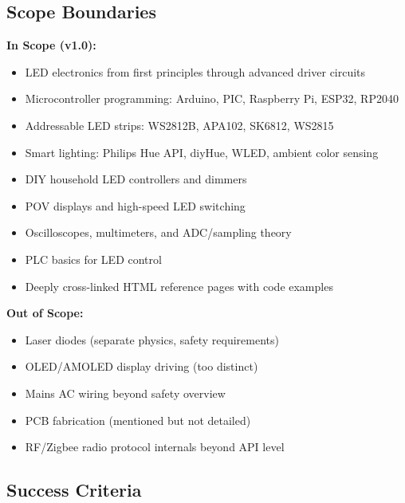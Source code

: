 \documentclass[11pt,letterpaper]{article}
\begin{document}
\subsection{Scope Boundaries}

\textbf{In Scope (v1.0):}
\begin{itemize}[noitemsep]
  \item LED electronics from first principles through advanced driver circuits
  \item Microcontroller programming: Arduino, PIC, Raspberry Pi, ESP32, RP2040
  \item Addressable LED strips: WS2812B, APA102, SK6812, WS2815
  \item Smart lighting: Philips Hue API, diyHue, WLED, ambient color sensing
  \item DIY household LED controllers and dimmers
  \item POV displays and high-speed LED switching
  \item Oscilloscopes, multimeters, and ADC/sampling theory
  \item PLC basics for LED control
  \item Deeply cross-linked HTML reference pages with code examples
\end{itemize}

\textbf{Out of Scope:}
\begin{itemize}[noitemsep]
  \item Laser diodes (separate physics, safety requirements)
  \item OLED/AMOLED display driving (too distinct)
  \item Mains AC wiring beyond safety overview
  \item PCB fabrication (mentioned but not detailed)
  \item RF/Zigbee radio protocol internals beyond API level
\end{itemize}

\subsection{Success Criteria}
\end{document}
